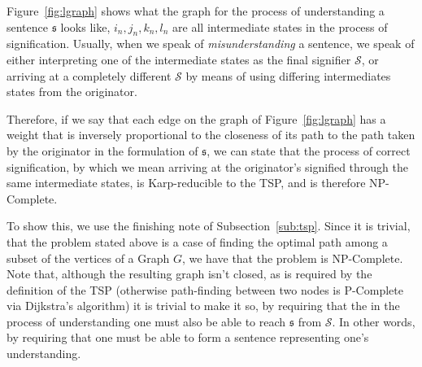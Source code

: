\documentclass[11pt,letterpaper]{article}
\theoremstyle{definition}
\begin{document}
\begin{minipage}{\linewidth}
	\label{fig:lgraph}
\end{minipage}
\newpage
Figure~\ref{fig:lgraph} shows what the graph for the process of understanding a sentence \(\mathfrak{s}\) looks like, \(i_n, j_n, k_n, l_n\) are all intermediate states in the process of signification. Usually, when we speak of \emph{misunderstanding} a sentence, we speak of either interpreting one of the intermediate states as the final signifier \(\mathscr{S}\), or arriving at a completely different \(\mathscr{S}\) by means of using differing intermediates states from the originator.

Therefore, if we say that each edge on the graph of Figure~\ref{fig:lgraph} has a weight that is inversely proportional to the closeness of its path to the path taken by the originator in the formulation of \(\mathfrak{s}\), we can state that the process of correct signification, by which we mean arriving at the originator's signified through the same intermediate states, is Karp-reducible to the TSP, and is therefore NP-Complete.

To show this, we use the finishing note of Subsection~\ref{sub:tsp}. Since it is trivial, that the problem stated above is a case of finding the optimal path among a subset of the vertices of a Graph \(G\), we have that the problem is NP-Complete.
Note that, although the resulting graph isn't closed, as is required by the definition of the TSP (otherwise path-finding between two nodes is P-Complete via Dijkstra's algorithm) it is trivial to make it so, by requiring that the in the process of understanding one must also be able to reach \(\mathfrak{s}\) from \(\mathscr{S}\). In other words, by requiring that one must be able to form a sentence representing one's understanding.
\end{document}
